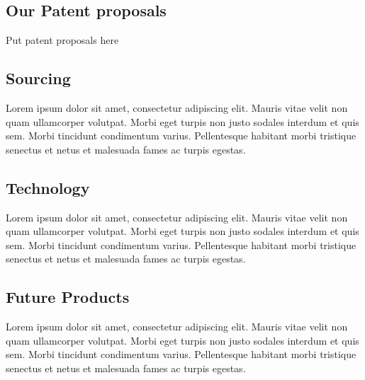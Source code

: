 \documentclass[11pt,a4paper,titlepage]{article}
\begin{document}
\subsection{Our Patent proposals}
Put patent proposals here\newline

\subsection{Sourcing}
Lorem ipsum dolor sit amet, consectetur adipiscing elit. Mauris vitae velit 
non quam ullamcorper volutpat. Morbi eget turpis non justo sodales interdum 
et quis sem. Morbi tincidunt condimentum varius. Pellentesque habitant morbi 
tristique senectus et netus et malesuada fames ac turpis egestas.\newline
\subsection{Technology}
Lorem ipsum dolor sit amet, consectetur adipiscing elit. Mauris vitae velit 
non quam ullamcorper volutpat. Morbi eget turpis non justo sodales interdum 
et quis sem. Morbi tincidunt condimentum varius. Pellentesque habitant morbi 
tristique senectus et netus et malesuada fames ac turpis egestas.\newline
\subsection{Future Products}
Lorem ipsum dolor sit amet, consectetur adipiscing elit. Mauris vitae velit 
non quam ullamcorper volutpat. Morbi eget turpis non justo sodales interdum 
et quis sem. Morbi tincidunt condimentum varius. Pellentesque habitant morbi 
tristique senectus et netus et malesuada fames ac turpis egestas.\newline
\pagebreak
\end{document}
